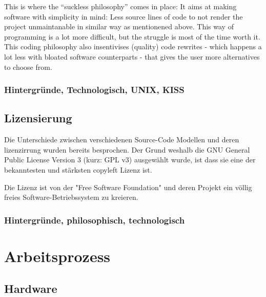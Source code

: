 \documentclass[a4paper,11pt]{article}
\begin{document}
This is where the ``suckless philosophy'' comes in place: It aims at making software with simplicity in mind: Less source lines of code to not render the project unmaintanable in similar way as mentionened above. This way of programming is a lot more difficult, but the struggle is most of the time worth it. This coding philosophy also insentivises (quality) code rewrites - which happens a lot less with bloated software counterparts - that gives the user more alternatives to choose from.

\subsubsection{Hintergründe, Technologisch, UNIX, KISS}
\subsection{Lizensierung}


Die Unterschiede zwischen verschiedenen Source-Code Modellen und deren lizenzirrung wurden bereits besprochen. Der Grund weshalb die GNU General Public License Version 3 (kurz: GPL v3) ausgewählt 
wurde, ist dass sie eine der bekanntesten und stärksten copyleft Lizenz ist.

Die Lizenz ist von der "Free Software Foundation" und deren Projekt ein völlig freies Software-Betriebssystem zu kreieren. 

\subsubsection{Hintergründe, philosophisch, technologisch}

\section{Arbeitsprozess}

\subsection{Hardware}
\end{document}
